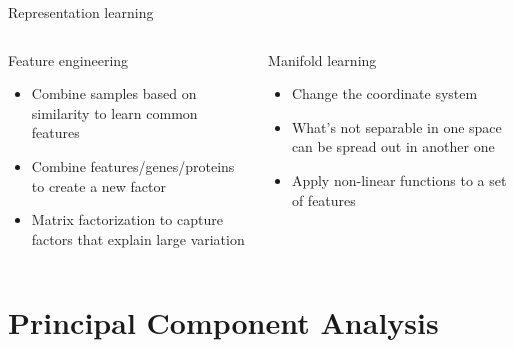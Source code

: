 \documentclass[
  ignorenonframetext,
  aspectratio=169]{beamer}
\begin{document}
\begin{frame}{Representation learning}
\protect\hypertarget{representation-learning}{}
\begin{columns}[T]
\begin{column}{.45\textwidth}
\begin{block}{Feature engineering}
\protect\hypertarget{feature-engineering-2}{}
\begin{itemize}
\item
  Combine samples based on similarity to learn common features
\item
  Combine features/genes/proteins to create a new factor
\item
  Matrix factorization to capture factors that explain large variation
\end{itemize}
\end{block}
\end{column}

\begin{column}{.45\textwidth}
\begin{block}{Manifold learning}
\protect\hypertarget{manifold-learning-1}{}
\begin{itemize}
\item
  Change the coordinate system
\item
  What's not separable in one space can be spread out in another one
\item
  Apply non-linear functions to a set of features
\end{itemize}
\end{block}
\end{column}
\end{columns}
\end{frame}

\hypertarget{principal-component-analysis}{%
\section{Principal Component
Analysis}\label{principal-component-analysis}}
\end{document}
